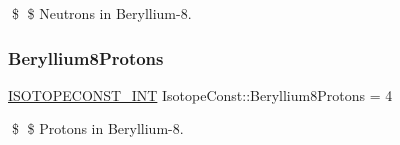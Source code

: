 \$ \$ Neutrons in Beryllium-\/8. \mbox{\label{group___isotope_const-_beryllium-_be8_ga16fd37dff5603a841104c9cd9bc81e29}} 
\subsubsection{\texorpdfstring{Beryllium8\+Protons}{Beryllium8Protons}}
{\footnotesize\ttfamily \mbox{\hyperlink{group___isotope_const-_macros_ga5f18360b3e99483a35c32d789e62621c}{I\+S\+O\+T\+O\+P\+E\+C\+O\+N\+S\+T\+\_\+\+I\+NT}} Isotope\+Const\+::\+Beryllium8\+Protons = 4}

\$ \$ Protons in Beryllium-\/8. 